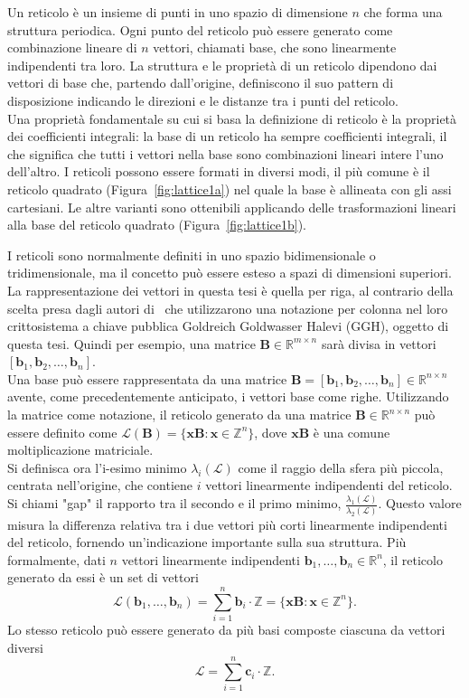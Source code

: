 Un reticolo è un insieme di punti in uno spazio di dimensione $n$ che forma una struttura 
periodica. Ogni punto del reticolo può essere generato come combinazione lineare di 
$n$ vettori, chiamati base, che sono linearmente indipendenti tra loro.
La struttura e le proprietà di un reticolo dipendono dai vettori di base che, 
partendo dall'origine, definiscono il suo pattern di disposizione indicando le direzioni 
e le distanze tra i punti del reticolo. \\
Una proprietà fondamentale su cui si basa la definizione di reticolo è la proprietà dei 
coefficienti integrali: la base di un reticolo ha sempre coefficienti integrali, 
il che significa che tutti i vettori nella base sono combinazioni lineari intere 
l'uno dell'altro.
I reticoli possono essere formati in diversi modi, il più comune è il reticolo quadrato 
(Figura~\ref{fig:lattice1a}) nel quale la base è allineata con gli assi cartesiani. 
Le altre varianti sono ottenibili applicando delle trasformazioni lineari alla base del 
reticolo quadrato (Figura~\ref{fig:lattice1b}).


I reticoli sono normalmente definiti in uno spazio bidimensionale o tridimensionale, 
ma il concetto può essere esteso a spazi di dimensioni superiori. La rappresentazione dei vettori in questa tesi è quella per riga, 
al contrario della scelta presa dagli autori di~\cite{GGH97} che utilizzarono una notazione per
colonna nel loro crittosistema a chiave pubblica Goldreich Goldwasser Halevi (GGH), oggetto di questa tesi. Quindi per esempio, una matrice 
$\mathbf{B} \in \mathbb{R}^{m\times n}$ sarà divisa in vettori 
$[\mathbf{b}_1, \mathbf{b}_2, \dots, \mathbf{b}_n]$. 
\\
Una base può essere rappresentata da una matrice  
$\mathbf{B} = [\mathbf{b}_1,\mathbf{b}_2,\dots,\mathbf{b}_n] \in \mathbb{R}^{n \times n}$ 
avente, come precedentemente anticipato, i vettori base come righe.  Utilizzando la matrice come notazione, 
il reticolo generato da una matrice 
$\mathbf{B} \in \mathbb{R}^{n \times n}$ 
può essere definito come 
${\mathcal{L}(\mathbf{B}) = \bigl\{ \mathbf{x}\mathbf{B} : \mathbf{x} \in \mathbb{Z}^n \bigr\}}$, 
dove $\mathbf{x} \mathbf{B}$ 
è una comune moltiplicazione matriciale. \\
Si definisca ora l'i-esimo minimo $\lambda_i(\mathcal{L})$ come il raggio della sfera più 
piccola, centrata nell'origine, che contiene $i$ vettori linearmente indipendenti del reticolo. 
Si chiami "gap" il rapporto tra il secondo e il primo minimo, 
$\frac{\lambda_1(\mathcal{L})}{\lambda_2(\mathcal{L})}$. 
Questo valore misura la differenza relativa tra i due vettori più corti linearmente 
indipendenti del reticolo, fornendo un'indicazione importante sulla sua struttura.
Più formalmente, dati $n$ vettori linearmente indipendenti 
$\mathbf{b}_1,\dots, \mathbf{b}_n \in \mathbb{R}^n$,
il reticolo generato da essi è un set di vettori 
\[
\mathcal{L} (\mathbf{b}_1,\dots,\mathbf{b}_n) = \sum_{i=1}^{n}\mathbf{b}_i \cdot 
\mathbb{Z} = \bigl\{ {\mathbf{x} \mathbf{B} : \mathbf{x} \in \mathbb{Z}^n} \bigr\}.
\]
Lo stesso reticolo può essere generato da più basi composte ciascuna da vettori diversi
\[
    \mathcal{L} = \sum_{i=1}^{n}\mathbf{c}_i \cdot \mathbb{Z} .
\]

